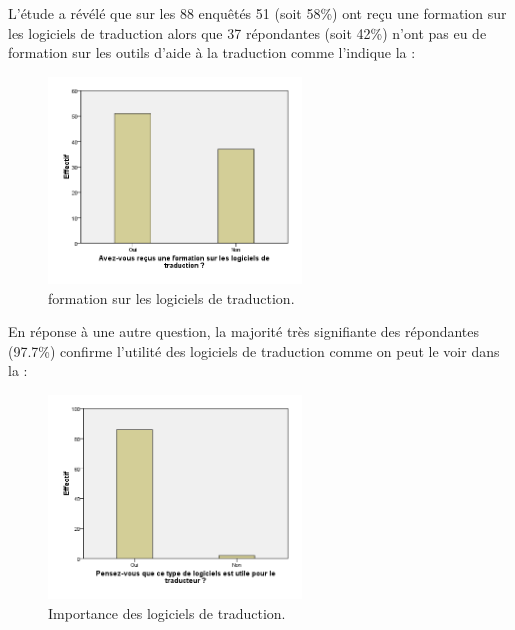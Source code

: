 \documentclass{textolivre}
\begin{document}
L’étude a révélé que sur les 88 enquêtés 51 (soit 58\%) ont reçu une formation sur les logiciels de traduction alors que 37 répondantes (soit 42\%) n’ont pas eu de formation sur les outils d’aide à la traduction comme l’indique la :
\begin{figure}[htbp]
\centering
\includegraphics[width=0.6\textwidth]{fig01.png}
\caption{formation sur les logiciels de traduction.}
\label{fig01}
\end{figure}

En réponse à une autre question, la majorité très signifiante des répondantes (97.7\%) confirme l’utilité des logiciels de traduction comme on peut le voir dans la :
\begin{figure}[htbp]
\centering
\includegraphics[width=0.6\textwidth]{fig02.png}
\caption{Importance des logiciels de traduction.}
\label{fig02}
\end{figure}
\end{document}
